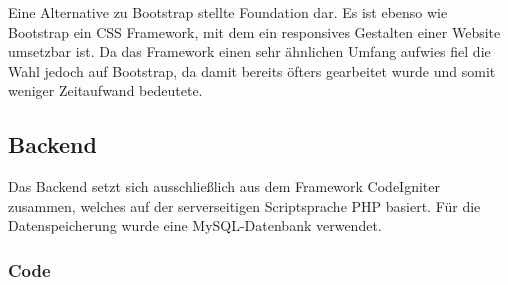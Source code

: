       Eine Alternative zu Bootstrap stellte {Foundation\cite{foundation}} dar. Es ist ebenso wie Bootstrap ein CSS Framework, mit dem ein responsives Gestalten einer Website umsetzbar ist.
      Da das Framework einen sehr ähnlichen Umfang aufwies fiel die Wahl jedoch auf Bootstrap, da damit bereits öfters gearbeitet wurde und somit weniger Zeitaufwand bedeutete.

    \subsection*{Backend}
    Das Backend setzt sich ausschließlich aus dem Framework CodeIgniter zusammen, welches auf der serverseitigen Scriptsprache PHP basiert. Für die Datenspeicherung
    wurde eine MySQL-Datenbank verwendet.

      \subsubsection*{Code}
